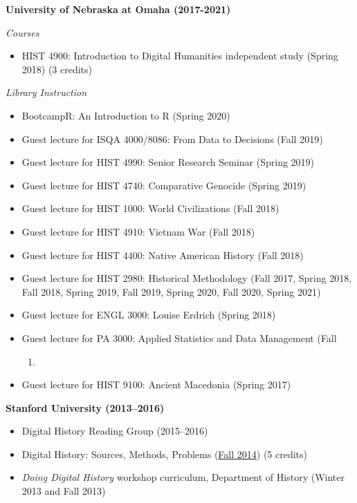 \textbf{University of Nebraska at Omaha (2017-2021)}

\emph{Courses}

\begin{itemize}
\tightlist
\item
  HIST 4900: Introduction to Digital Humanities independent study
  (Spring 2018) (3 credits)
\end{itemize}

\emph{Library Instruction}

\begin{itemize}
\tightlist
\item
  BootcampR: An Introduction to R (Spring 2020)
\item
  Guest lecture for ISQA 4000/8086: From Data to Decisions (Fall 2019)
\item
  Guest lecture for HIST 4990: Senior Research Seminar (Spring 2019)
\item
  Guest lecture for HIST 4740: Comparative Genocide (Spring 2019)
\item
  Guest lecture for HIST 1000: World Civilizations (Fall 2018)
\item
  Guest lecture for HIST 4910: Vietnam War (Fall 2018)
\item
  Guest lecture for HIST 4400: Native American History (Fall 2018)
\item
  Guest lecture for HIST 2980: Historical Methodology (Fall 2017, Spring
  2018, Fall 2018, Spring 2019, Fall 2019, Spring 2020, Fall 2020,
  Spring 2021)
\item
  Guest lecture for ENGL 3000: Louise Erdrich (Spring 2018)
\item
  Guest lecture for PA 3000: Applied Statistics and Data Management
  (Fall

  \begin{enumerate}
  \def\labelenumi{\arabic{enumi})}
  \setcounter{enumi}{2016}
  \tightlist
  \item
  \end{enumerate}
\item
  Guest lecture for HIST 9100: Ancient Macedonia (Spring 2017)
\end{itemize}

\textbf{Stanford University (2013--2016)}

\begin{itemize}
\tightlist
\item
  Digital History Reading Group (2015--2016)
\item
  Digital History: Sources, Methods, Problems
  (\href{http://jasonheppler.org/teaching/hist205f.2014/}{Fall 2014}) (5
  credits)
\item
  \emph{Doing Digital History} workshop curriculum, Department of
  History (Winter 2013 and Fall 2013)
\end{itemize}

